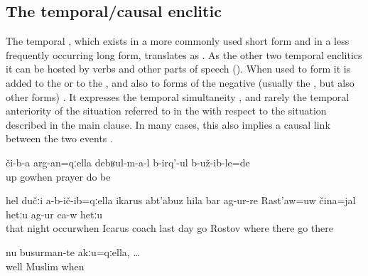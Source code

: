 
\subsection{The temporal/causal enclitic  }
\label{sec:enclitic =qella}

The temporal , which exists in a more commonly used short form and in a less frequently occurring long form, translates as . As the other two temporal enclitics it can be hosted by verbs and other parts of speech (). When used to form  it is added to the   or to the  , and also to forms of the negative  (usually the , but also other forms) . It expresses the temporal simultaneity , and rarely the temporal anteriority  of the situation referred to in the  with respect to the situation described in the main clause. In many cases, this also implies a causal link between the two events .
%

\begin{exe}
	\ex	\label{ex:‎When they went up there they were praying}
	\gll	či-b-a	arg-an=qːella		debʁul-m-a-l	b-irq'-ul	b-už-ib-le=de\\
		up	gowhen	prayer	do	be\\
	\glt	{}

	\ex	\label{ex:‎When / after / because at that night}
	\gll	hel	dučːi	a-b-ič-ib=qːella	ikarus	abt'abuz	hila	bar	ag-ur-re	Rast'aw=uw	čina=jal	hetːu	ag-ur	ca-w	hetːu\\
		that	night	occurwhen	Icarus	coach	last	day	go	Rostov	where	there	go		there\\
	\glt	{}

	\ex	\label{ex:Well because (they) were not Muslims}
	\gll	nu	busurman-te	akːu=qːella,	\ldots\\
		well	Muslim 	when\\
	\glt	{}
\end{exe}


